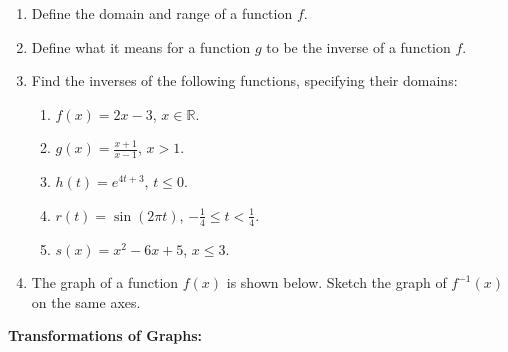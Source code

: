 \documentclass{article}
\begin{document}
\begin{enumerate}
	\item Define the domain and range of a function $f$.
	\item Define what it means for a function $g$ to be the inverse of a function $f$.
	\item Find the inverses of the following functions, specifying their domains:
		\begin{enumerate}
			\item $f(x)=2x-3$, $x\in\mathbb{R}$.
			\item $g(x)=\frac{x+1}{x-1}$, $x>1$.
			\item $h(t)=e^{4t+3}$, $t\leq 0$.
			\item $r(t)=\sin(2\pi t)$, $-\frac{1}{4}\leq t < \frac{1}{4}$.
			\item $s(x)=x^2-6x+5$, $x\leq 3$.
		\end{enumerate}
	\item The graph of a function $f(x)$ is shown below. Sketch the graph of $f^{-1}(x)$ on the same axes.
		\begin{center}
		\end{center}
\end{enumerate}


\clearpage



\textbf{Transformations of Graphs:}

\vspace{5mm}
\end{document}
